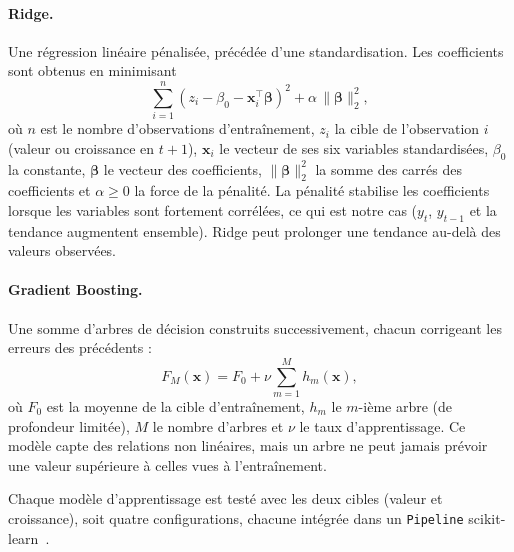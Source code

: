 \documentclass[11pt,a4paper]{article}
\begin{document}
\paragraph{Ridge.} Une régression linéaire pénalisée, précédée d'une standardisation. Les coefficients sont obtenus en minimisant
\begin{equation}\label{eq:ridge}
\sum_{i=1}^{n}\left(z_i-\beta_0-\mathbf{x}_i^{\top}\boldsymbol{\beta}\right)^2+\alpha\,\lVert\boldsymbol{\beta}\rVert_2^2 ,
\end{equation}
où $n$ est le nombre d'observations d'entraînement, $z_i$ la cible de l'observation $i$ (valeur ou croissance en $t+1$), $\mathbf{x}_i$ le vecteur de ses six variables standardisées, $\beta_0$ la constante, $\boldsymbol{\beta}$ le vecteur des coefficients, $\lVert\boldsymbol{\beta}\rVert_2^2$ la somme des carrés des coefficients et $\alpha \geq 0$ la force de la pénalité. La pénalité stabilise les coefficients lorsque les variables sont fortement corrélées, ce qui est notre cas ($y_t$, $y_{t-1}$ et la tendance augmentent ensemble). Ridge peut prolonger une tendance au-delà des valeurs observées.

\paragraph{Gradient Boosting.} Une somme d'arbres de décision construits successivement, chacun corrigeant les erreurs des précédents :
\begin{equation}\label{eq:gbr}
F_M(\mathbf{x}) = F_0 + \nu\sum_{m=1}^{M} h_m(\mathbf{x}),
\end{equation}
où $F_0$ est la moyenne de la cible d'entraînement, $h_m$ le $m$-ième arbre (de profondeur limitée), $M$ le nombre d'arbres et $\nu$ le taux d'apprentissage. Ce modèle capte des relations non linéaires, mais un arbre ne peut jamais prévoir une valeur supérieure à celles vues à l'entraînement.

Chaque modèle d'apprentissage est testé avec les deux cibles (valeur et croissance), soit quatre configurations, chacune intégrée dans un \texttt{Pipeline} scikit-learn~\cite{sklearn}.
\end{document}
